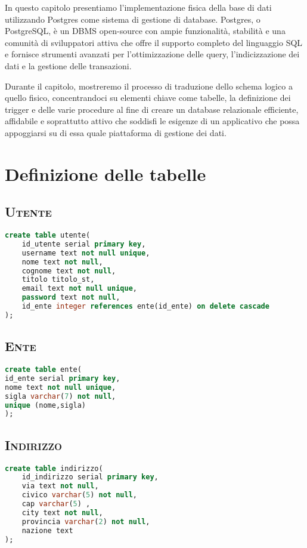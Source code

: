 In questo capitolo presentiamo l'implementazione fisica della base di dati utilizzando Postgres come sistema di gestione di database. Postgres, o PostgreSQL, è un DBMS open-source con ampie funzionalità, stabilità e una comunità di sviluppatori attiva che offre il supporto completo del linguaggio SQL e fornisce strumenti avanzati per l'ottimizzazione delle query, l'indicizzazione dei dati e la gestione delle transazioni. 
\bigskip

Durante il capitolo, mostreremo il processo di traduzione dello schema logico a quello fisico, concentrandoci su elementi chiave come tabelle, la definizione dei trigger e delle varie procedure al fine di creare un database relazionale efficiente, affidabile e soprattutto attivo che soddisfi le esigenze di un applicativo che possa appoggiarsi su di essa quale piattaforma di gestione dei dati.
\section{Definizione delle tabelle}
\subsection{\textsc{Utente}}
\begin{lstlisting}[language=SQL,style=mystyle,caption={Tabella: Utente}]
create table utente(
    id_utente serial primary key,
    username text not null unique,
    nome text not null,
    cognome text not null,
    titolo titolo_st,
    email text not null unique,
    password text not null,
    id_ente integer references ente(id_ente) on delete cascade
);
\end{lstlisting}
\subsection{\textsc{Ente}}
\begin{lstlisting}[language=SQL,style=mystyle,caption={Tabella: Ente}]
create table ente(
id_ente serial primary key,
nome text not null unique,
sigla varchar(7) not null,
unique (nome,sigla)
);
\end{lstlisting}
\subsection{\textsc{Indirizzo}}
\begin{lstlisting}[language=SQL,style=mystyle,caption={Tabella: Indirizzo}]
create table indirizzo(
    id_indirizzo serial primary key,
    via text not null,
    civico varchar(5) not null,
    cap varchar(5) ,
    city text not null,
    provincia varchar(2) not null,
    nazione text
);
\end{lstlisting}
